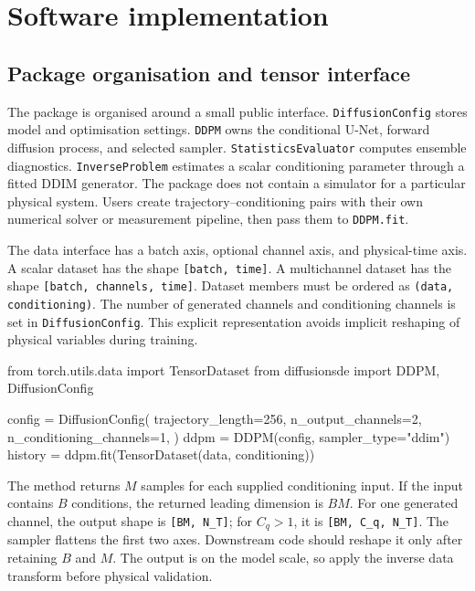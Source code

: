 \section{Software implementation}
\label{sec:software}

\subsection{Package organisation and tensor interface}

The package is organised around a small public interface. \texttt{DiffusionConfig}
stores model and optimisation settings. \texttt{DDPM} owns the conditional U-Net,
forward diffusion process, and selected sampler. \texttt{StatisticsEvaluator}
computes ensemble diagnostics. \texttt{InverseProblem} estimates a scalar
conditioning parameter through a fitted DDIM generator. The package
does not contain a simulator for a particular physical system. Users create
trajectory--conditioning pairs with their own numerical solver or measurement
pipeline, then pass them to \texttt{DDPM.fit}.

The data interface has a batch axis, optional channel axis, and physical-time
axis. A scalar dataset has the shape \texttt{[batch, time]}. A multichannel
dataset has the shape \texttt{[batch, channels, time]}. Dataset members must be
ordered as \texttt{(data, conditioning)}. The number of generated channels and
conditioning channels is set in \texttt{DiffusionConfig}. This explicit
representation avoids implicit reshaping of physical variables during training.

\begin{pythonlisting}
from torch.utils.data import TensorDataset
from diffusionsde import DDPM, DiffusionConfig

config = DiffusionConfig(
    trajectory_length=256,
    n_output_channels=2,
    n_conditioning_channels=1,
)
ddpm = DDPM(config, sampler_type="ddim")
history = ddpm.fit(TensorDataset(data, conditioning))
\end{pythonlisting}

The method returns $M$ samples for each supplied conditioning input. If the input
contains $B$ conditions, the returned leading dimension is $BM$. For one generated
channel, the output shape is \texttt{[BM, N\_T]}; for $C_q>1$, it is
\texttt{[BM, C\_q, N\_T]}. The sampler flattens the first two axes. Downstream
code should reshape it only after retaining $B$ and $M$. The output is on the
model scale, so apply the inverse data transform before physical validation.

